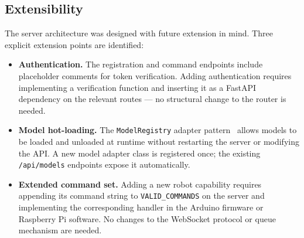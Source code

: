 \subsection{Extensibility}
\label{sec:server_ext}

The server architecture was designed with future extension in mind.
Three explicit extension points are identified:

\begin{itemize}
	\item \textbf{Authentication.} The registration and command
	endpoints include placeholder comments for token
	verification. Adding authentication requires implementing
	a verification function and inserting it as a FastAPI
	dependency on the relevant routes — no structural change
	to the router is needed.
	
	\item \textbf{Model hot-loading.} The \texttt{ModelRegistry}
	adapter pattern~\cite{gamma1994design} allows models to be
	loaded and unloaded at runtime without restarting the
	server or modifying the API. A new model adapter class is
	registered once; the existing \texttt{/api/models}
	endpoints expose it automatically.
	
	\item \textbf{Extended command set.} Adding a new robot
	capability requires appending its command string to
	\texttt{VALID\_COMMANDS} on the server and implementing
	the corresponding handler in the Arduino firmware or
	Raspberry Pi software. No changes to the WebSocket
	protocol or queue mechanism are needed.
\end{itemize}

%
%
